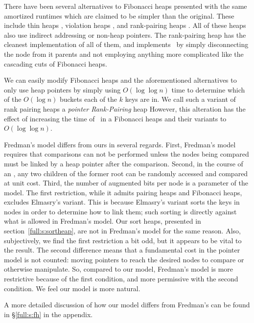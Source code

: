 There have been several alternatives to Fibonacci heaps presented with the same amortized runtimes which are claimed to be simpler than the original. These include
thin heaps \cite{DBLP:journals/talg/KaplanT08},
violation heaps \cite{DBLP:journals/dmaa/Elmasry10},
and rank-pairing heaps \cite{DBLP:journals/siamcomp/HaeuplerST11}.
All of these heaps also use indirect addressing or non-heap pointers. The rank-pairing heap has the cleanest implementation of all of them, and implements \opDc\ by simply disconnecting the node from it parents and not employing anything more complicated like the cascading cuts of Fibonacci heaps.

We can easily modify Fibonacci heaps and the aforementioned alternatives to only use heap pointers by simply 
using $O(\log \log n)$ time to determine which of the $O(\log n)$ buckets each of the $k$ keys are in. We call such a variant of rank pairing heaps a \emph{pointer Rank-Pairing} heap However, this alteration has the effect of increasing the time of \opDc\ in a Fibonacci heaps and their variants to $O(\log \log n)$. 

Fredman's model differs from ours in several regards. First, Fredman's model requires that comparisons can not be performed unless the nodes being compared must be linked by a heap pointer after the comparison. Second, in the course of an \opEm, any two children of the former root can be randomly accessed and compared at unit cost. Third, the number of augmented bits per node is a parameter of the model. The first restriction, while it admits pairing heaps and Fibonacci heaps, excludes Elmasry's variant. This is because Elmasry's variant sorts the keys in nodes in order to determine how to link them; such sorting is directly against what is allowed in Fredman's model. Our sort heaps, presented in section~\ref{full:s:sortheap}, are not in Fredman's model for the same reason. Also, subjectively, we find the first restriction a bit odd, but it appears to be vital to the result. The second difference means that a fundamental cost in the pointer model is not counted: moving pointers to reach the desired nodes to compare or otherwise manipulate. So, compared to our model, Fredman's model is more restrictive because of the first condition, and more permissive with the second condition. We feel our model is more natural.
\begin{shortonly}
A more detailed discussion of how our model differs from Fredman's can be found in \S\ref{full:s:fh} in the appendix.
\end{shortonly}

